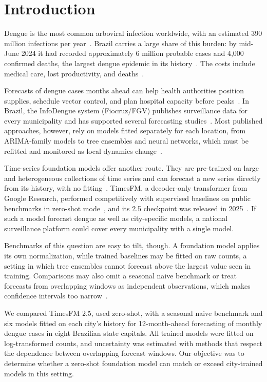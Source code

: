 \documentclass[10pt,letterpaper]{article}
\begin{document}
\clearpage
{}
\linenumbers

\section*{Introduction}
Dengue is the most common arboviral infection worldwide, with an estimated 390 million infections per year~\cite{Bhatt2013}. Brazil carries a large share of this burden: by mid-June 2024 it had recorded approximately 6 million probable cases and 4,000 confirmed deaths, the largest dengue epidemic in its history~\cite{GurgelGoncalves2024}. The costs include medical care, lost productivity, and deaths~\cite{Siqueira2022}.

Forecasts of dengue cases months ahead can help health authorities position supplies, schedule vector control, and plan hospital capacity before peaks~\cite{Roster2022}. In Brazil, the InfoDengue system (Fiocruz/FGV) publishes surveillance data for every municipality and has supported several forecasting studies~\cite{Codeco2018infodengue}. Most published approaches, however, rely on models fitted separately for each location, from ARIMA-family models to tree ensembles and neural networks, which must be refitted and monitored as local dynamics change~\cite{Leung2023,Roster2022,Chen2025lstm}.

Time-series foundation models offer another route. They are pre-trained on large and heterogeneous collections of time series and can forecast a new series directly from its history, with no fitting~\cite{Das2024timesfm,Ansari2024chronos,Woo2024moirai}. TimesFM, a decoder-only transformer from Google Research, performed competitively with supervised baselines on public benchmarks in zero-shot mode~\cite{Das2024timesfm}, and its 2.5 checkpoint was released in 2025~\cite{TimesFM25card}. If such a model forecast dengue as well as city-specific models, a national surveillance platform could cover every municipality with a single model.

Benchmarks of this question are easy to tilt, though. A foundation model applies its own normalization, while trained baselines may be fitted on raw counts, a setting in which tree ensembles cannot forecast above the largest value seen in training. Comparisons may also omit a seasonal naive benchmark or treat forecasts from overlapping windows as independent observations, which makes confidence intervals too narrow~\cite{Hewamalage2023}.

We compared TimesFM 2.5, used zero-shot, with a seasonal naive benchmark and six models fitted on each city's history for 12-month-ahead forecasting of monthly dengue cases in eight Brazilian state capitals. All trained models were fitted on log-transformed counts, and uncertainty was estimated with methods that respect the dependence between overlapping forecast windows. Our objective was to determine whether a zero-shot foundation model can match or exceed city-trained models in this setting.
\end{document}
